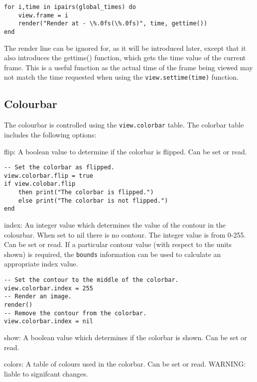 \documentclass[11pt,twoside]{book}
\begin{document}
\begin{lstlisting}[style=lua]
for i,time in ipairs(global_times) do
    view.frame = i
    render("Render at - \%.0fs(\%.0fs)", time, gettime())
end
\end{lstlisting}

The render line can be ignored for, as it will be introduced later, except that
it also introduces the gettime() function, which gets the time value of the
current frame. This is a useful function as the actual time of the frame being
viewed may not match the time requested when using the
\lstinline{view.settime(time)} function.

\subsection{Colourbar}

The colourbar is controlled using the \lstinline{view.colorbar} table. The colorbar table includes the following options:

flip: A boolean value to determine if the colorbar is flipped. Can be set or
read.

\begin{lstlisting}[style=lua]
-- Set the colorbar as flipped.
view.colorbar.flip = true
if view.colobar.flip
    then print("The colorbar is flipped.")
    else print("The colorbar is not flipped.")
end
\end{lstlisting}


index: An integer value which determines the value of the contour in the
colourbar. When set to nil there is no contour. The integer value is from 0-255.
Can be set or read. If a particular contour value (with respect to the units
shown) is required, the \lstinline{bounds} information can be used to calculate
an appropriate index value.

\begin{lstlisting}[style=lua]
-- Set the contour to the middle of the colorbar.
view.colorbar.index = 255
-- Render an image.
render()
-- Remove the contour from the colorbar.
view.colorbar.index = nil
\end{lstlisting}

show: A boolean value which determines if the colorbar is shown. Can be set or
read.

colors: A table of colours used in the colorbar. Can be set or read. WARNING:
liable to signifcant changes.
\end{document}

